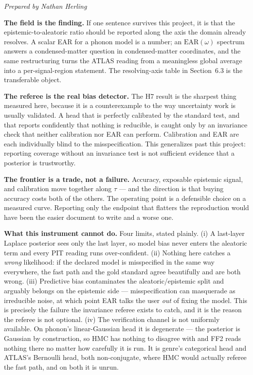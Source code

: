 \documentclass[11pt]{article}
\newcommand{\preparedby}{%
  \par\nobreak\vspace{-6pt}%
  {\footnotesize\itshape\color{forgemute}Prepared by Nathan Herling}%
  \par\vspace{4pt}}
\begin{document}
\preparedby
\newsection

\textbf{The field is the finding.} If one sentence survives this project, it
is that the epistemic-to-aleatoric ratio should be reported along the axis the
domain already resolves. A scalar EAR for a phonon model is a number; an
$\mathrm{EAR}(\omega)$ spectrum answers a condensed-matter question in
condensed-matter coordinates, and the same restructuring turns the ATLAS
reading from a meaningless global average into a per-signal-region statement.
The resolving-axis table in Section~6.3 is the transferable object.

\textbf{The referee is the real bias detector.} The H7 result is the sharpest
thing measured here, because it is a counterexample to the way uncertainty
work is usually validated. A head that is perfectly calibrated by the standard
test, and that reports confidently that nothing is reducible, is caught only
by an invariance check that neither calibration nor EAR can perform.
Calibration and EAR are each individually blind to the misspecification. This
generalizes past this project: reporting coverage without an invariance test is
not sufficient evidence that a posterior is trustworthy.

\textbf{The frontier is a trade, not a failure.} Accuracy, exposable epistemic
signal, and calibration move together along $\tau$ --- and the direction is
that buying accuracy costs both of the others. The operating point is a
defensible choice on a measured curve. Reporting only the endpoint that
flatters the reproduction would have been the easier document to write and a
worse one.

\textbf{What this instrument cannot do.} Four limits, stated plainly. (i) A
last-layer Laplace posterior sees only the last layer, so model bias never
enters the aleatoric term and every PIT reading runs over-confident.
(ii) Nothing here catches a \emph{wrong} likelihood: if the declared model is
misspecified in the same way everywhere, the fast path and the gold standard
agree beautifully and are both wrong. (iii) Predictive bias contaminates the
aleatoric/epistemic split and arguably belongs on the epistemic side ---
misspecification can masquerade as irreducible noise, at which point EAR
talks the user \emph{out} of fixing the model. This is precisely the failure
the invariance referee exists to catch, and it is the reason the referee is
not optional. (iv) The verification channel is not uniformly available. On phonon's
linear-Gaussian head it is degenerate --- the posterior is Gaussian by
construction, so HMC has nothing to disagree with and FF2 reads nothing there no
matter how carefully it is run. It is genre's categorical head and ATLAS's
Bernoulli head, both non-conjugate, where HMC would actually referee the fast
path, and on both it is unrun.
\end{document}
